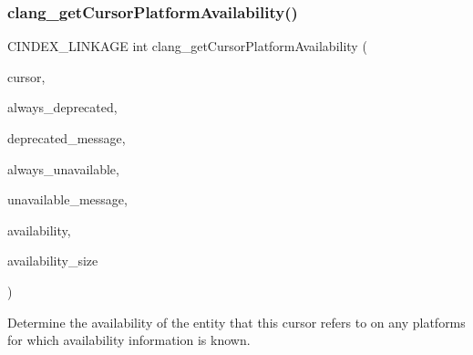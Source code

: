 \subsubsection{\texorpdfstring{clang\+\_\+get\+Cursor\+Platform\+Availability()}{clang\_getCursorPlatformAvailability()}}
{\footnotesize\ttfamily C\+I\+N\+D\+E\+X\+\_\+\+L\+I\+N\+K\+A\+GE int clang\+\_\+get\+Cursor\+Platform\+Availability (\begin{DoxyParamCaption}\item[{\hyperlink{structCXCursor}{C\+X\+Cursor}}]{cursor,  }\item[{int $\ast$}]{always\+\_\+deprecated,  }\item[{\hyperlink{structCXString}{C\+X\+String} $\ast$}]{deprecated\+\_\+message,  }\item[{int $\ast$}]{always\+\_\+unavailable,  }\item[{\hyperlink{structCXString}{C\+X\+String} $\ast$}]{unavailable\+\_\+message,  }\item[{\hyperlink{structCXPlatformAvailability}{C\+X\+Platform\+Availability} $\ast$}]{availability,  }\item[{int}]{availability\+\_\+size }\end{DoxyParamCaption})}



Determine the availability of the entity that this cursor refers to on any platforms for which availability information is known. 


